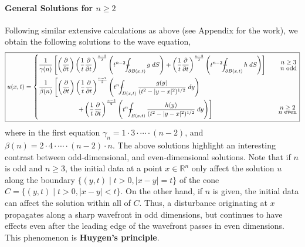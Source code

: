 \documentclass{article}
\def\Xint#1{\mathchoice
	{\XXint\displaystyle\textstyle{#1}}%
	{\XXint\textstyle\scriptstyle{#1}}%
	{\XXint\scriptstyle\scriptscriptstyle{#1}}%
	{\XXint\scriptscriptstyle\scriptscriptstyle{#1}}%
	\!\int}
\def\XXint#1#2#3{{\setbox0=\hbox{$#1{#2#3}{\int}$ }
		\vcenter{\hbox{$#2#3$ }}\kern-0.6\wd0}}
\def\dashint{\Xint-}
\begin{document}
\paragraph{General Solutions for \texorpdfstring{$n\geq 2$}{n > 1}} Following similar extensive calculations as above (see Appendix for the work), we obtain the following solutions to the wave equation, 
\begin{equation}
	\boxed{
		u(x, t) = 
		\left\{
		\begin{alignedat}{2}
			&\frac{1}{\gamma(n)}\left[\left(\frac{\partial}{\partial t}\right)\left(\frac{1}{t}\frac{\partial}{\partial t}\right)^{\frac{n-3}{2}}\left(t^{n-2}\dashint_{\partial B(x,t)}g\;dS\right) + \left(\frac{1}{t}\frac{\partial}{\partial t}\right)^{\frac{n-3}{2}}\left(t^{n-2}\dashint_{\partial B(x,t)}h\;dS\right)\right] &\qquad \substack{\displaystyle n \geq 3 \\ \displaystyle n \text{ odd}} \\
			&\frac{1}{\beta(n)}\left[\left(\frac{\partial}{\partial t}\right)\left(\frac{1}{t}\frac{\partial}{\partial t}\right)^{\frac{n-2}{2}}\left(t^{n}\dashint_{B(x,t)}\frac{g(y)}{(t^{2} - |y - x|^{2})^{1/2}}\;dy\right)\right. &\\
			&\qquad \qquad \qquad \left.+ \left(\frac{1}{t}\frac{\partial}{\partial t}\right)^{\frac{n-2}{2}}\left(t^{n}\dashint_{B(x,t)}\frac{h(y)}{(t^{2} - |y - x|^{2})^{1/2}}\;dy\right)\right] &\qquad \substack{\displaystyle n \geq 2 \\ \displaystyle n \text{ even}}
		\end{alignedat}
		\right.
	}
\end{equation}
where in the first equation $\gamma_{n} = 1 \cdot 3 \cdot \dotsm\cdot (n-2)$, and $\beta(n) = 2 \cdot 4 \cdot \dotsm \cdot (n-2) \cdot n$. The above solutions highlight an interesting contrast between odd-dimensional, and even-dimensional solutions. Note that if $n$ is odd and $n \geq 3$, the initial data at a point $x\in \mathbb{R}^{n}$ only affect the solution $u$ along the boundary $\{(y,t) \mid t > 0, |x -y| = t\}$ of the cone $C = \{(y,t)\mid t > 0, |x - y| < t\}$. On the other hand, if $n$ is given, the initial data can affect the solution within all of $C$. Thus, a disturbance originating at $x$ propagates along a sharp wavefront in odd dimensions, but continues to have effects even after the leading edge of the wavefront passes in even dimensions. This phenomenon is \textbf{Huygen's principle}. 
\end{document}
